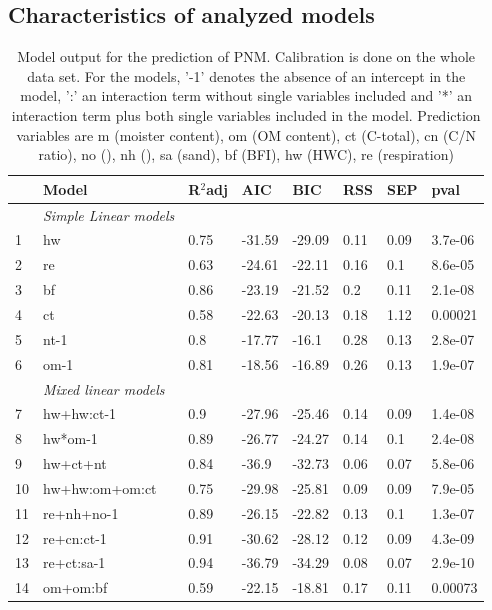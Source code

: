 \documentclass[10pt,twoside,dutch,english]{report}
\begin{document}
\begin{appendices}
\section{Characteristics of analyzed models }

\begin{table}[H] %
		\caption{Model output for the prediction of PNM. Calibration is done on the whole data set. For the models,  '-1' denotes the absence of an intercept in the model,  ':' an interaction term without single variables included and '*' an interaction term plus both single variables included in the model. Prediction variables are m (moister content), om (OM content), ct (C-total), cn (C/N ratio), no (), nh (), sa (sand), bf (BFI), hw (HWC), re (respiration)}
		\footnotesize 
		\renewcommand{\arraystretch}{1.2}
		
		\begin{tabu} to \textwidth{X[1,l]X[3,l]X[1,r]X[1,r]X[1,r]X[1,r]X[1,r]X[1,r]}
			\toprule \rowfont{\bfseries}
 & Model & R$^2$adj & AIC & BIC & RSS & SEP & pval \\ 
 \midrule
&\textit{Simple Linear models}& & & & & & \\
1 & hw & 0.75 & -31.59 & -29.09 & 0.11 & 0.09 & 3.7e-06 \\ 
  2 & re & 0.63 & -24.61 & -22.11 & 0.16 & 0.1 & 8.6e-05 \\ 
  3 & bf & 0.86 & -23.19 & -21.52 & 0.2 & 0.11 & 2.1e-08 \\ 
  4 & ct & 0.58 & -22.63 & -20.13 & 0.18 & 1.12 & 0.00021 \\ 
  5 & nt-1 & 0.8 & -17.77 & -16.1 & 0.28 & 0.13 & 2.8e-07 \\ 
  6 & om-1 & 0.81 & -18.56 & -16.89 & 0.26 & 0.13 & 1.9e-07 \\ \addlinespace[0.5cm]
&\textit{Mixed linear models}& & & & & & \\
7 & hw+hw:ct-1 & 0.9 & -27.96 & -25.46 & 0.14 & 0.09 & 1.4e-08 \\ 
  8 & hw*om-1 & 0.89 & -26.77 & -24.27 & 0.14 & 0.1 & 2.4e-08 \\ 
  9 & hw+ct+nt & 0.84 & -36.9 & -32.73 & 0.06 & 0.07 & 5.8e-06 \\ 
  10 & hw+hw:om+om:ct & 0.75 & -29.98 & -25.81 & 0.09 & 0.09 & 7.9e-05 \\ 
  11 & re+nh+no-1 & 0.89 & -26.15 & -22.82 & 0.13 & 0.1 & 1.3e-07 \\ 
  12 & re+cn:ct-1 & 0.91 & -30.62 & -28.12 & 0.12 & 0.09 & 4.3e-09 \\ 
  13 & re+ct:sa-1 & 0.94 & -36.79 & -34.29 & 0.08 & 0.07 & 2.9e-10 \\ 
  14 & om+om:bf & 0.59 & -22.15 & -18.81 & 0.17 & 0.11 & 0.00073 \\ 
\bottomrule
			

\end{tabu}
\end{table}
\end{appendices}
\end{document}
